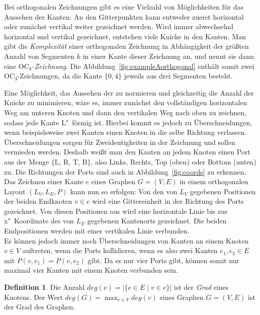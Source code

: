 \documentclass[a4paper]{scrreprt}
\theoremstyle{definition}
\newtheorem{definition}[satz]{Definition}
\begin{document}
Bei orthogonalen Zeichnungen gibt es eine Vielzahl von Möglichkeiten für das Aussehen der Kanten: An den Gitterpunkten kann entweder zuerst horizontal oder zunächst vertikal weiter gezeichnet werden. Wird immer abwechselnd horizontal und vertikal gezeichnet, entstehen viele Knicke in den Kanten. Man gibt die \emph{Komplexität} einer orthogonalen Zeichnung in Abhängigkeit der größten Anzahl von Segmenten $k$ in einer Kante dieser Zeichnung an, und nennt sie dann eine \emph{$\text{OC}_k$-Zeichnung}. Die Abbildung~\ref{fig:exampleAorthogonal} enthält somit zwei OC$_3$-Zeichnungen, da die Kante $\{0,4\}$ jeweils aus drei Segmenten besteht.

Eine Möglichkeit, das Aussehen der zu normieren und gleichzeitig die Anzahl der Knicke zu minimieren, wäre es, immer zunächst den vollständigen horizontalen Weg am unteren Knoten und dann den vertikalen Weg nach oben zu zeichnen, sodass jede Kante L"~förmig ist. Hierbei kommt es jedoch zu Überschneidungen, wenn beispielsweise zwei Kanten einen Knoten in die selbe Richtung verlassen. Überschneidungen sorgen für Zweideutigkeiten in der Zeichnung und sollen vermieden werden. Deshalb weißt man den Kanten an jedem Knoten einen Port aus der Menge $\{\text{L, R, T, B}\}$, also Links, Rechts, Top (oben) oder Bottom (unten) zu. Die Richtungen der Ports sind auch in Abbildung~\ref{fig:coords} zu erkennen.
\\

Das Zeichnen einer Kante $e$ eines Graphen $G = (V,E)$ in einem orthogonalen Layout $(L_V,L_E,P)$ kann nun so erfolgen: Von den von $L_V$ gegebenen Positionen der beiden Endknoten $v \in e$ wird eine Gittereinheit in der Richtung des Ports gezeichnet. Von diesen Positionen aus wird eine horizontale Linie bis zur x"~Koordinate des von $L_E$ gegebenen Kantenorts gezeichnet. Die beiden Endpositionen werden mit einer vertikalen Linie verbunden. %
\\

Es können jedoch immer noch Überschneidungen von Kanten an einem Knoten $v \in V$ auftreten, wenn die Ports kollidieren, wenn es also zwei Kanten $e_1, e_2 \in E$ mit $P(v, e_1) = P(v, e_2)$ gibt. Da es nur vier Ports gibt, können somit nur maximal vier Kanten mit einem Knoten verbunden sein.

\begin{definition}
  Die Anzahl $deg(v) = |\{e \in E \mid v \in e\}|$ ist der \emph{Grad} eines Knotens. Der Wert $deg(G) = \max_{v \in V}{deg(v)}$ eines Graphen $G = (V, E)$ ist der Grad des Graphen.
\end{definition}
\end{document}
